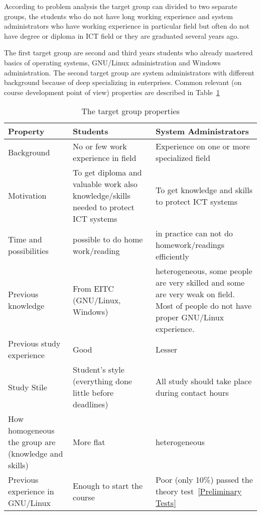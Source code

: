 According to problem analysis the target group can divided to two separate groups, the students who do not have long working experience and system administrators who have working experience in particular field but often do not have degree or diploma in \gls{ICT} field or they are graduated several years ago.

The first target group are second and third years students who already mastered basics of operating systems, GNU/Linux administration and Windows administration. The second target group are system administrators with different background because of deep specializing in enterprises. Common relevant (on course development point of view)  properties are described in Table~\ref{tab:targetgroup}
\begin{table}[h]
\centering
\caption{The target group properties}

\begin{tabular}{|p{4cm}|p{5cm}|p{5cm}|}
\hline 
\color{blue}
Property & \color{blue} Students & \color{blue} System Administrators \\ 
\hline 
Background & No or few work experience in field & Experience on one or more specialized field \\ 
\hline 
Motivation & To get diploma and valuable work also knowledge/skills needed to protect \gls{ICT} systems & To get knowledge and skills to protect \gls{ICT} systems \\ 
\hline 
Time and possibilities & possible to do home work/reading & in practice can not do homework/readings efficiently  \\ 
\hline 
Previous knowledge & From \gls{EITC} (GNU/Linux, Windows)  &  heterogeneous, some people are very skilled and some are very weak on field. Most of people do not have proper GNU/Linux experience.  \\ 
\hline 
Previous study experience & Good & Lesser \\ 
\hline 
Study Stile & Student's style (everything done little before deadlines) & All study should take place during contact hours  \\ 
\hline 
How homogeneous the group are (knowledge and skills) & More flat & heterogeneous \\ 
\hline 
Previous experience in GNU/Linux & Enough to start the course & Poor (only 10\%) passed the theory test~\ref{Preliminary Tests}  \\ 
\hline 
\end{tabular} 

\label{tab:targetgroup}
\end{table}

